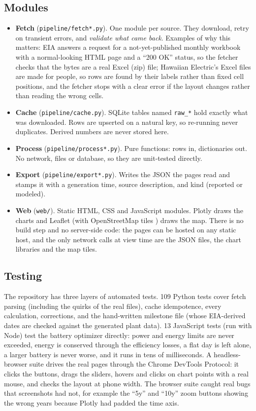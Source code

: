 \documentclass[11pt,a4paper]{article}
\newcommand{\code}[1]{\nolinkurl{#1}}      %
\begin{document}
\subsection{Modules}
\begin{itemize}
\item \textbf{Fetch} (\code{pipeline/fetch*.py}). One module per source. They download, retry on transient
 errors, and \emph{validate what came back}. Examples of why this matters: EIA answers a request for a
 not-yet-published monthly workbook with a normal-looking HTML page and a ``200 OK'' status, so the fetcher
 checks that the bytes are a real Excel (zip) file; Hawaiian Electric's Excel files are made for people, so
 rows are found by their labels rather than fixed cell positions, and the fetcher stops with a clear
 error if the layout changes rather than reading the wrong cells.
\item \textbf{Cache} (\code{pipeline/cache.py}). SQLite tables named \code{raw_*} hold exactly what was downloaded.
 Rows are upserted on a natural key, so re-running never duplicates. Derived numbers are never stored here.
\item \textbf{Process} (\code{pipeline/process*.py}). Pure functions: rows in, dictionaries out. No network, files
 or database, so they are unit-tested directly.
\item \textbf{Export} (\code{pipeline/export*.py}). Writes the JSON the pages read and stamps it with a generation
 time, source description, and kind (reported or modeled).
\item \textbf{Web} (\code{web/}). Static HTML, CSS and JavaScript modules. Plotly draws the charts and Leaflet
 (with OpenStreetMap tiles \cite{osm}) draws the map. There is no build step and no server-side code: the pages can be
 hosted on any static host, and the only network calls at view time are the JSON files, the chart libraries and
 the map tiles.
\end{itemize}

\subsection{Testing}
The repository has three layers of automated tests. 109 Python tests cover fetch parsing (including the quirks
of the real files), cache idempotence, every calculation, corrections, and the hand-written milestone file (whose
EIA-derived dates are checked against the generated plant data). 13 JavaScript tests (run with Node) test the
battery optimizer directly: power and energy limits are never exceeded, energy is conserved through the
efficiency losses, a flat day is left alone, a larger battery is never worse, and it runs in tens of
milliseconds. A headless-browser suite drives the real pages through the Chrome DevTools Protocol: it clicks the
buttons, drags the sliders, hovers and clicks on chart points with a real mouse, and checks the layout at phone
width. The browser suite caught real bugs that screenshots had not, for example the ``5y'' and ``10y'' zoom
buttons showing the wrong years because Plotly had padded the time axis.
\end{document}
